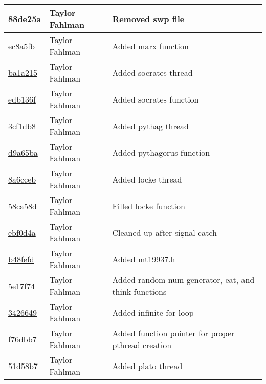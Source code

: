 \begin{tabular}{l l l}
\href{git@github.com:fahlmant/cs444/commit/88de25a62a2e699650bc207419b2b384abc5a748}{88de25a} & Taylor Fahlman & Removed swp file\\\hline
\href{git@github.com:fahlmant/cs444/commit/ec8a5fbea281d6bffd2f3df386889152fadb13bc}{ec8a5fb} & Taylor Fahlman & Added marx function\\\hline
\href{git@github.com:fahlmant/cs444/commit/ba1a2150d205c820597bf84f89c025edfb785238}{ba1a215} & Taylor Fahlman & Added socrates thread\\\hline
\href{git@github.com:fahlmant/cs444/commit/edb136fac1c4ed5c5317f7a7a967bad090b32c86}{edb136f} & Taylor Fahlman & Added socrates function\\\hline
\href{git@github.com:fahlmant/cs444/commit/3cf1db8bc4cada1b6be913bc35423bd7d5f15855}{3cf1db8} & Taylor Fahlman & Added pythag thread\\\hline
\href{git@github.com:fahlmant/cs444/commit/d9a65baf438b66b6e0a9fd4cbfdf14bbb4244d5c}{d9a65ba} & Taylor Fahlman & Added pythagorus function\\\hline
\href{git@github.com:fahlmant/cs444/commit/8a6cceb7c92a712f5428de6f30d8c77f80e8dc16}{8a6cceb} & Taylor Fahlman & Added locke thread\\\hline
\href{git@github.com:fahlmant/cs444/commit/58ca58d458e413a75a8c02487bb65cf6acef3d59}{58ca58d} & Taylor Fahlman & Filled locke function\\\hline
\href{git@github.com:fahlmant/cs444/commit/ebf0d4a0840a6a6bb8b17916dc160c469197593d}{ebf0d4a} & Taylor Fahlman & Cleaned up after signal catch\\\hline
\href{git@github.com:fahlmant/cs444/commit/b48fefd146280d909c6cf2155b3fe1fdec0a3974}{b48fefd} & Taylor Fahlman & Added mt19937.h\\\hline
\href{git@github.com:fahlmant/cs444/commit/5e17f747c9f116ab75a330d8ce0bfdb3f3ec35ab}{5e17f74} & Taylor Fahlman & Added random num generator, eat, and think functions\\\hline
\href{git@github.com:fahlmant/cs444/commit/3426649ae1918162e2ffc19e8b76ffebcbfeafb6}{3426649} & Taylor Fahlman & Added infinite for loop\\\hline
\href{git@github.com:fahlmant/cs444/commit/f76dbb79c66c9c07cf4077e12042e9a2e0fd820f}{f76dbb7} & Taylor Fahlman & Added function pointer for proper pthread creation\\\hline
\href{git@github.com:fahlmant/cs444/commit/51d58b7179ad83063834c6bf5eac684dbe2dcea1}{51d58b7} & Taylor Fahlman & Added plato thread\\\hline

\end{tabular}
